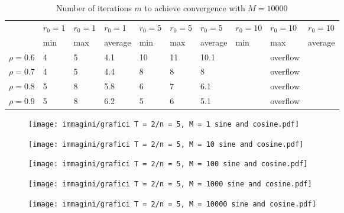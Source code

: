 \documentclass[a4paper,11pt,openright]{report}
\begin{document}
\begin{table}[H]
\centering
\addtolength{\leftskip}{-1.5cm}
\addtolength{\rightskip}{-1.5cm}
\begin{tabular}{|c|lllllllll|}
\hline
$ $ & $r_0 = 1$ & $r_0 = 1$ & $r_0 = 1$ & $r_0 = 5$ & $r_0 = 5$ & $r_0 = 5$ & $r_0 = 10$ & $r_0 = 10$ & $r_0 = 10$  \\
$ $ & min & max & average & min & max & average & min & max & average \\ 
\hline
$\rho = 0.6$ & 4 & 5 & 4.1 & 10 & 11 & 10.1 &  & overflow &  \\

$\rho = 0.7$ & 4 & 5 & 4.4 & 8 & 8 & 8 &  & overflow &  \\

$\rho = 0.8$ & 5 & 8 & 5.8 & 6 & 7 & 6.1 &  & overflow & \\

$\rho = 0.9$ & 5 & 8 & 6.2 & 5 & 6 & 5.1 &  & overflow & \\
\hline
\end{tabular}
\caption{Number of iterations $m$ to achieve convergence with $M = 10000$}
\end{table}
\begin{figure}[H]
\centering
\texttt{[image: immagini/grafici T = 2/n = 5, M = 1 sine and cosine.pdf]}
\end{figure}
\begin{figure}[H]
\centering
\texttt{[image: immagini/grafici T = 2/n = 5, M = 10 sine and cosine.pdf]}
\end{figure}
\begin{figure}[H]
\centering
\texttt{[image: immagini/grafici T = 2/n = 5, M = 100 sine and cosine.pdf]}
\end{figure}
\begin{figure}[H]
\centering
\texttt{[image: immagini/grafici T = 2/n = 5, M = 1000 sine and cosine.pdf]}
\end{figure}
\begin{figure}[H]
\centering
\texttt{[image: immagini/grafici T = 2/n = 5, M = 10000 sine and cosine.pdf]}
\end{figure}
\newpage
\end{document}
